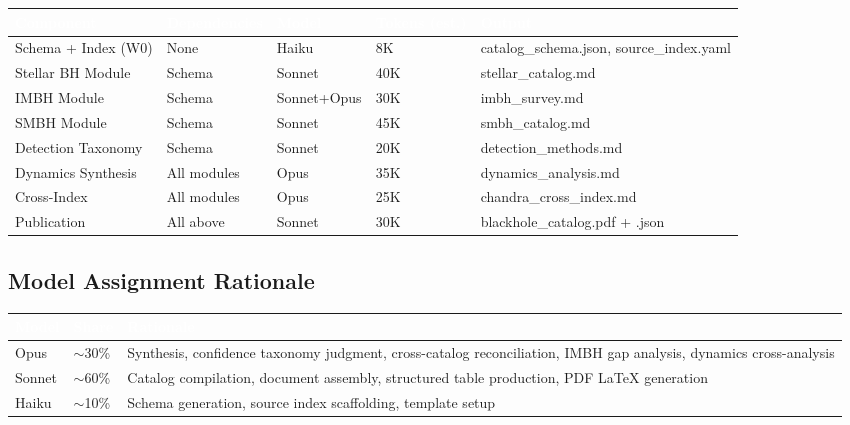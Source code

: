 \documentclass[11pt,letterpaper]{article}
\newcommand{\tableheader}[1]{\textbf{\sffamily\textcolor{white}{#1}}}
\begin{document}
\begin{center}
\begin{tabularx}{\textwidth}{L{3cm}L{2.5cm}C{1.8cm}C{2cm}X}
\toprule
{}
\tableheader{Component} & \tableheader{Dependencies} & \tableheader{Model} & \tableheader{Tokens (est.)} & \tableheader{Output} \\
\midrule
Schema + Index (W0) & None & Haiku & 8K & catalog\_schema.json, source\_index.yaml \\
Stellar BH Module & Schema & Sonnet & 40K & stellar\_catalog.md \\
IMBH Module & Schema & Sonnet+Opus & 30K & imbh\_survey.md \\
SMBH Module & Schema & Sonnet & 45K & smbh\_catalog.md \\
Detection Taxonomy & Schema & Sonnet & 20K & detection\_methods.md \\
Dynamics Synthesis & All modules & Opus & 35K & dynamics\_analysis.md \\
Cross-Index & All modules & Opus & 25K & chandra\_cross\_index.md \\
Publication & All above & Sonnet & 30K & blackhole\_catalog.pdf + .json \\
\bottomrule
\end{tabularx}
\end{center}

\subsection{Model Assignment Rationale}

\begin{center}
\begin{tabularx}{\textwidth}{C{1.5cm}C{2cm}X}
\toprule
{}
\tableheader{Model} & \tableheader{Share} & \tableheader{Rationale} \\
\midrule
Opus & $\sim$30\% & Synthesis, confidence taxonomy judgment, cross-catalog reconciliation, IMBH gap analysis, dynamics cross-analysis \\
Sonnet & $\sim$60\% & Catalog compilation, document assembly, structured table production, PDF LaTeX generation \\
Haiku & $\sim$10\% & Schema generation, source index scaffolding, template setup \\
\bottomrule
\end{tabularx}
\end{center}
\end{document}
